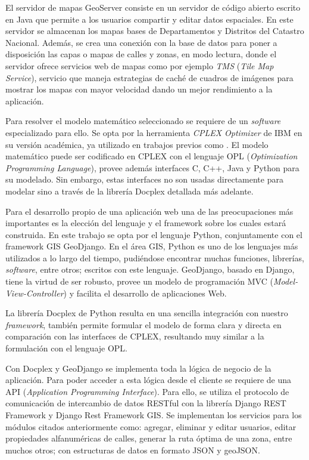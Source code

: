 \documentclass[spanish, conference]{IEEEtran}
\begin{document}
El servidor de mapas GeoServer consiste en un servidor de código abierto escrito en Java que permite a los usuarios compartir y editar datos espaciales. En este servidor se almacenan los mapas bases de Departamentos y Distritos del Catastro Nacional. Además, se crea una conexión con la base de datos para poner a disposición las capas o mapas de calles y zonas, en modo lectura, donde el servidor ofrece servicios web de mapas como por ejemplo \textit{TMS} (\textit{Tile Map Service}), servicio que maneja estrategias de caché de cuadros de imágenes para mostrar los mapas con mayor velocidad dando un mejor rendimiento a la aplicación.

Para resolver el modelo matemático seleccionado se requiere de un \textit{software} especializado para ello. Se opta por la herramienta \textit{CPLEX Optimizer} de IBM en su versión académica, ya utilizado en trabajos previos como \cite{Vecchi2016ACollection}  \cite{Ramos2018TheApproaches} \cite{BabaeeTirkolaee2019DevelopingStudy}. El modelo matemático puede ser codificado en CPLEX con el lenguaje OPL ({\textit{Optimization Programming Language}}), provee además interfaces C, C++, Java y Python para su modelado. Sin embargo, estas interfaces no son usadas directamente para modelar sino a través de la librería Docplex detallada más adelante.

Para el desarrollo propio de una aplicación web una de las preocupaciones más importantes es la elección del lenguaje y el framework sobre los cuales estará construida. En este trabajo se opta por el lenguaje Python, conjuntamente con el framework GIS GeoDjango. En el área GIS, Python es uno de los lenguajes más utilizados a lo largo del tiempo, pudiéndose encontrar muchas funciones, librerías, \textit{software}, entre otros; escritos con este lenguaje. GeoDjango, basado en Django, tiene la virtud de ser robusto, provee un modelo de programación MVC (\textit{Model-View-Controller}) y facilita el desarrollo de aplicaciones Web.

La librería Docplex de Python resulta en una sencilla integración con nuestro \textit{framework}, también permite formular el modelo de forma clara y directa en comparación con las interfaces de CPLEX, resultando muy similar a la formulación con el lenguaje OPL.

Con Docplex y GeoDjango se implementa toda la lógica de negocio de la aplicación. Para poder acceder a esta lógica desde el cliente se requiere de una API (\textit{Application Programming Interface}). Para ello, se utiliza el protocolo de comunicación de intercambio de datos RESTful con la librería Django REST Framework y Django Rest Framework GIS. Se implementan los servicios para los módulos citados anteriormente como: agregar, eliminar y editar usuarios, editar propiedades alfanuméricas de calles, generar la ruta óptima de una zona, entre muchos otros; con estructuras de datos en formato JSON y geoJSON.
\end{document}
